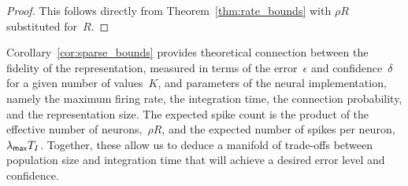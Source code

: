 \begin{proof}
  This follows directly from Theorem~\ref{thm:rate_bounds} with $\rho R$ substituted for~$R$.
\end{proof}

Corollary~\ref{cor:sparse_bounds} provides theoretical connection
between the fidelity of the representation, measured in terms of the
error~$\epsilon$ and confidence~$\delta$ for a given number of
values~$K$, and parameters of the neural implementation, namely the
maximum firing rate, the integration time, the connection probability,
and the representation size.  The expected spike count is the product
of the effective number of neurons,~$\rho R$, and the expected number
of spikes per neuron,~$\lambda_{\mathsf{max}} T_I$.  Together, these allow us to
deduce a manifold of trade-offs between population size and
integration time that will achieve a desired error level and
confidence. 



